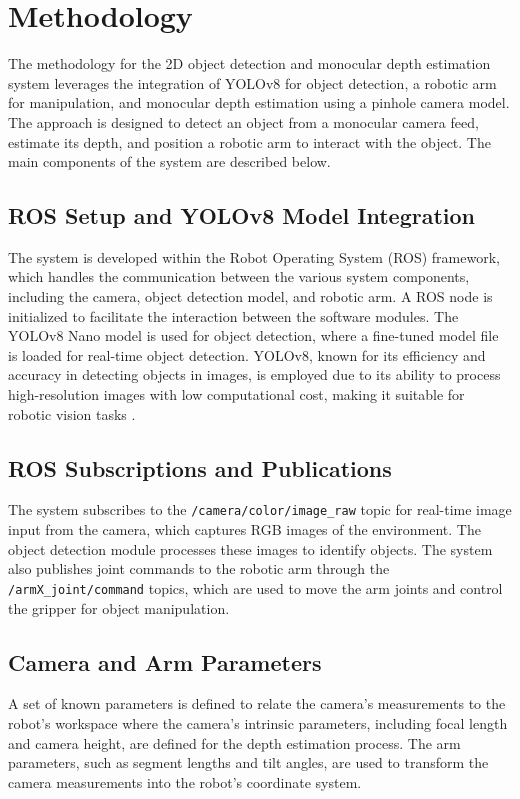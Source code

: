 \section{Methodology}

The methodology for the 2D object detection and monocular depth estimation system leverages the integration of YOLOv8 for object detection, a robotic arm for manipulation, and monocular depth estimation using a pinhole camera model. The approach is designed to detect an object from a monocular camera feed, estimate its depth, and position a robotic arm to interact with the object. The main components of the system are described below.

\subsection{ROS Setup and YOLOv8 Model Integration}
The system is developed within the Robot Operating System (ROS) framework, which handles the communication between the various system components, including the camera, object detection model, and robotic arm. A ROS node is initialized to facilitate the interaction between the software modules. The YOLOv8 Nano model is used for object detection, where a fine-tuned model file is loaded for real-time object detection. YOLOv8, known for its efficiency and accuracy in detecting objects in images, is employed due to its ability to process high-resolution images with low computational cost, making it suitable for robotic vision tasks \cite{redmon2016yolo9000betterfasterstronger}.

\subsection{ROS Subscriptions and Publications}
The system subscribes to the \texttt{/camera/color/image\_raw} topic for real-time image input from the camera, which captures RGB images of the environment. The object detection module processes these images to identify objects. The system also publishes joint commands to the robotic arm through the \texttt{/armX\_joint/command} topics, which are used to move the arm joints and control the gripper for object manipulation.

\subsection{Camera and Arm Parameters}
A set of known parameters is defined to relate the camera's measurements to the robot’s workspace where the camera’s intrinsic parameters, including focal length and camera height, are defined for the depth estimation process. The arm parameters, such as segment lengths and tilt angles, are used to transform the camera measurements into the robot's coordinate system. 


